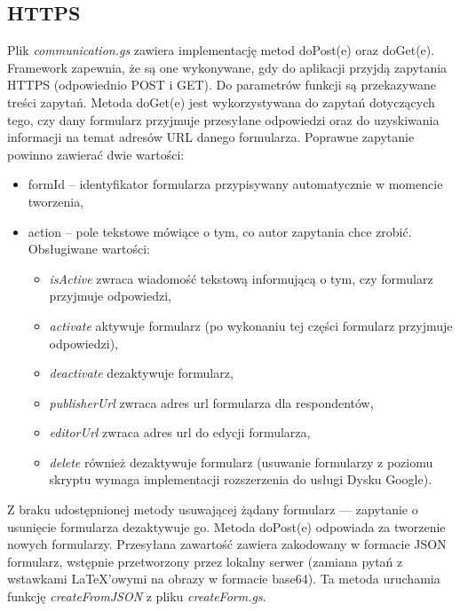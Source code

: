 \subsection{HTTPS}
Plik \textit{communication.gs} zawiera implementację metod doPost(e) oraz doGet(e). Framework zapewnia, że są one wykonywane, gdy do aplikacji przyjdą zapytania HTTPS (odpowiednio POST i GET). Do parametrów funkcji są przekazywane treści zapytań.
\ind Metoda doGet(e) jest wykorzystywana do zapytań dotyczących tego, czy dany formularz przyjmuje przesyłane odpowiedzi oraz do uzyskiwania informacji na temat adresów URL danego formularza.  Poprawne zapytanie powinno zawierać dwie wartości:
\begin{itemize}
\item formId -- identyfikator formularza przypisywany automatycznie w momencie tworzenia,
\item action -- pole tekstowe mówiące o tym, co autor zapytania chce zrobić. Obsługiwane wartości:
\begin{itemize}
\item \textit{isActive} zwraca wiadomość tekstową informującą o tym, czy formularz przyjmuje odpowiedzi,
\item \textit{activate} aktywuje formularz (po wykonaniu tej części formularz przyjmuje odpowiedzi),
\item \textit{deactivate} dezaktywuje formularz,
\item \textit{publisherUrl} zwraca adres url formularza dla respondentów,
\item \textit{editorUrl} zwraca adres url do edycji formularza,
\item \textit{delete} również dezaktywuje formularz (usuwanie formularzy z poziomu skryptu wymaga implementacji rozszerzenia do usługi Dysku Google).
\end{itemize}
\end{itemize}
Z braku udostępnionej metody usuwającej żądany formularz --- zapytanie o usunięcie formularza dezaktywuje go. 
\ind Metoda doPost(e) odpowiada  za tworzenie nowych formularzy. Przesyłana zawartość zawiera zakodowany w formacie JSON formularz, wstępnie przetworzony przez lokalny serwer (zamiana pytań z wstawkami \LaTeX{}'owymi na obrazy w formacie base64). Ta metoda uruchamia funkcję \textit{createFromJSON} z pliku \textit{createForm.gs}.
